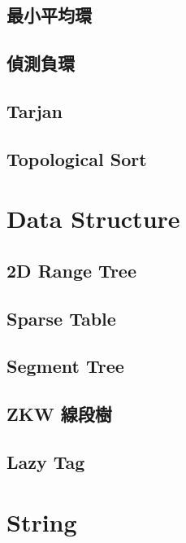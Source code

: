 \subsection{最小平均環}

\subsection{偵測負環}

\subsection{Tarjan}

\subsection{Topological Sort}


\section{Data Structure}

\subsection{2D Range Tree}

\subsection{Sparse Table}

\subsection{Segment Tree}

\subsection{ZKW 線段樹}

\subsection{Lazy Tag}




\section{String}

